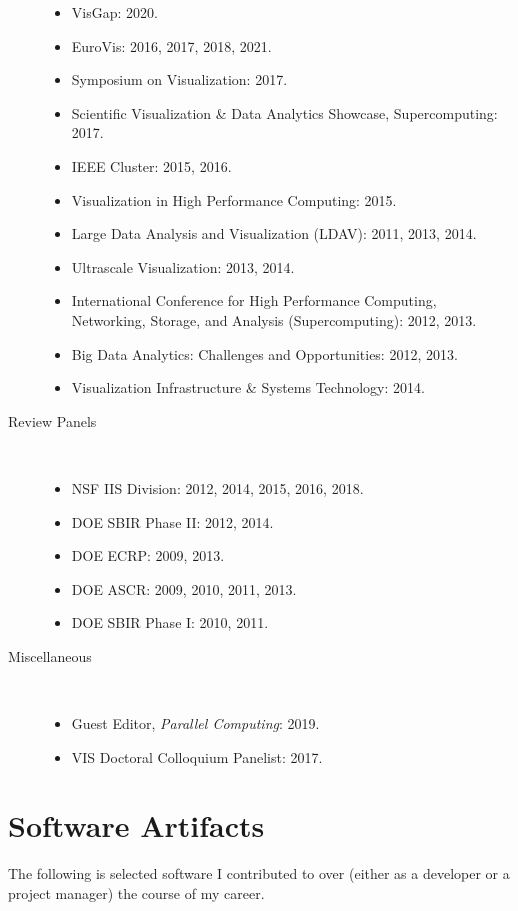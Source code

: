 \documentclass{article}
\begin{document}
\begin{description}
\begin{itemize}
  \item
    VisGap: 2020.
  \item
    EuroVis: 2016, 2017, 2018, 2021.
  \item
    Symposium on Visualization: 2017.
  \item
    Scientific Visualization \& Data Analytics Showcase, Supercomputing: 2017.
  \item
    IEEE Cluster: 2015, 2016.
  \item
    Visualization in High Performance Computing: 2015.
  \item
    Large Data Analysis and Visualization (LDAV): 2011, 2013, 2014.
  \item
    Ultrascale Visualization: 2013, 2014.
  \item
    International Conference for High Performance Computing, Networking, Storage, and Analysis (Supercomputing): 2012, 2013.
  \item
    Big Data Analytics: Challenges and Opportunities: 2012, 2013.
  \item
    Visualization Infrastructure \& Systems Technology: 2014.
  \end{itemize}
\item[Review Panels]~
  \begin{itemize}
  \item
    NSF IIS Division: 2012, 2014, 2015, 2016, 2018.
  \item
    DOE SBIR Phase II: 2012, 2014.
  \item
    DOE ECRP: 2009, 2013.
  \item
    DOE ASCR: 2009, 2010, 2011, 2013.
  \item
    DOE SBIR Phase I: 2010, 2011.
  \end{itemize}
\item[Miscellaneous]~
  \begin{itemize}
  \item
    Guest Editor, \emph{Parallel Computing}: 2019.
  \item
    VIS Doctoral Colloquium Panelist: 2017.
  \end{itemize}
\end{description}

\section*{Software Artifacts}

The following is selected software I contributed to over (either as a developer or a project manager) the course of my career.
\end{document}
